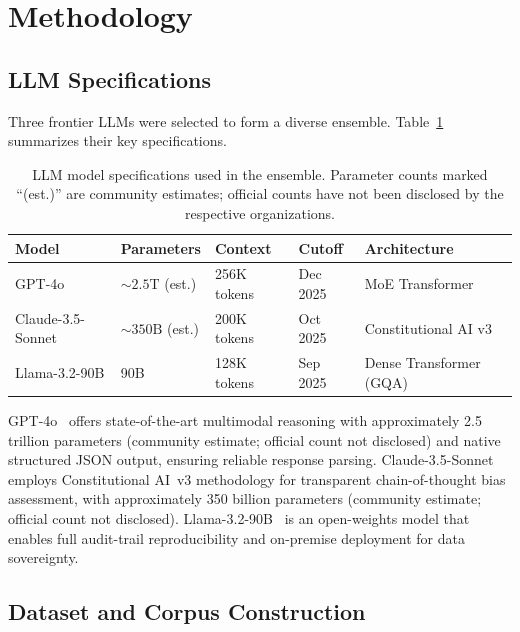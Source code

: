 \documentclass[10pt,letterpaper]{article}
\begin{document}
\section{Methodology}
\label{sec:methodology}

\subsection{LLM Specifications}

Three frontier LLMs were selected to form a diverse ensemble.
Table~\ref{tab:llm_specs} summarizes their key specifications.

\begin{table}[h]
\centering
\caption{LLM model specifications used in the ensemble.  Parameter counts marked
``(est.)'' are community estimates; official counts have not been disclosed by the
respective organizations.}
\label{tab:llm_specs}
\begin{tabular}{lllll}
\toprule
\textbf{Model} & \textbf{Parameters} & \textbf{Context} & \textbf{Cutoff} & \textbf{Architecture} \\
\midrule
GPT-4o            & ${\sim}2.5\text{T}$ (est.) & 256K tokens & Dec 2025 & MoE Transformer \\
Claude-3.5-Sonnet & ${\sim}350\text{B}$ (est.) & 200K tokens & Oct 2025 & Constitutional AI v3 \\
Llama-3.2-90B     & 90B                        & 128K tokens & Sep 2025 & Dense Transformer (GQA) \\
\bottomrule
\end{tabular}
\end{table}

\noindent GPT-4o~\citep{openai2024gpt4o} offers state-of-the-art multimodal
reasoning with approximately 2.5 trillion parameters (community estimate; official
count not disclosed) and native structured JSON output, ensuring reliable response
parsing.  Claude-3.5-Sonnet~\citep{anthropic2025claude} employs Constitutional
AI~v3 methodology for transparent chain-of-thought bias assessment, with
approximately 350 billion parameters (community estimate; official count not
disclosed).  Llama-3.2-90B~\citep{meta2025llama32} is an open-weights model that
enables full audit-trail reproducibility and on-premise deployment for data
sovereignty.

\subsection{Dataset and Corpus Construction}
\end{document}
